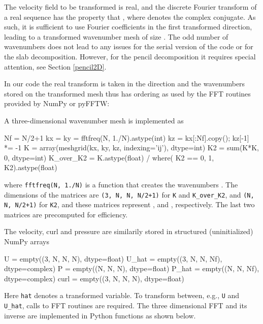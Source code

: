 \documentclass[final,3p,times,twocolumn]{elsarticle}
\newcommand{\inpyth}{\lstinline[style=inlinestyle]}
\begin{document}
The velocity field to be transformed is real, and the discrete Fourier transform of a real sequence has the property that , where  denotes the complex conjugate. As such, it is sufficient to use  Fourier coefficients in the first transformed direction, leading to a transformed wavenumber mesh of size . The odd number of wavenumbers does not lead to any issues for the serial version of the code or for the slab decomposition. However, for the pencil decomposition it requires special attention, see Section \ref{pencil2D}.

In our code the real transform is taken in the  direction and the 
wavenumbers  stored on the transformed mesh thus has 
ordering as used by the FFT routines provided by NumPy or pyFFTW:


A three-dimensional wavenumber mesh is implemented as

\noindent
\begin{minipage}[l]{\columnwidth}
\begin{python}
Nf = N/2+1
kx = ky = fftfreq(N, 1./N).astype(int)
kz = kx[:Nf].copy(); kz[-1] *= -1
K = array(meshgrid(kx, ky, kz, 
          indexing='ij'), dtype=int)
K2 = sum(K*K, 0, dtype=int)
K_over_K2 = K.astype(float) / where(
            K2 == 0, 1, K2).astype(float)
\end{python}
\end{minipage}
where \inpyth{fftfreq(N, 1./N)} is a function that creates the wavenumbers . The dimensions of the matrices are 
\inpyth{(3, N, N, N/2+1)} for \texttt{K} and \texttt{K\_over\_K2}, and 
\inpyth{(N, N, N/2+1)} for \texttt{K2}, and these matrices represent , 
 and , respectively. The last two matrices are 
precomputed for efficiency.

The velocity, curl and pressure are similarily stored in structured 
(uninitialized) NumPy arrays

\begin{python}
U     = empty((3, N, N, N),  dtype=float)
U_hat = empty((3, N, N, Nf), dtype=complex)
P     = empty((N, N, N),     dtype=float)
P_hat = empty((N, N, Nf),    dtype=complex)
curl  = empty((3, N, N, N),  dtype=float)
\end{python}
Here \inpyth{hat} denotes a transformed variable. To transform between, e.g., 
\inpyth{U} and \inpyth{U_hat}, calls to FFT routines are required. The three 
dimensional FFT and its inverse are implemented in Python functions as shown 
below.
\end{document}
